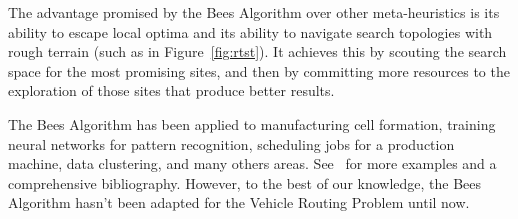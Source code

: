 The advantage promised by the Bees Algorithm over other meta-heuristics is its ability to escape local optima and its ability to navigate search topologies with rough terrain (such as in Figure~\ref{fig:rtst}). It achieves this by scouting the search space for the most promising sites, and then by committing more resources to the exploration of those sites that produce better results.


The Bees Algorithm has been applied to manufacturing cell formation, training neural networks for pattern recognition, scheduling jobs for a production machine, data clustering, and many others areas. See~\cite{beesalg} for more examples and a comprehensive bibliography. However, to the best of our knowledge, the Bees Algorithm hasn't been adapted for the Vehicle Routing Problem until now.
